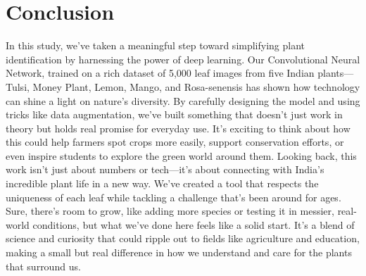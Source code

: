 \documentclass[twocolumn]{article}
\begin{document}
\section{Conclusion}
In this study, we've taken a meaningful step toward simplifying plant identification by harnessing the power of deep learning. Our Convolutional Neural Network, trained on a rich dataset of 5,000 leaf images from five Indian plants—Tulsi, Money Plant, Lemon, Mango, and Rosa-senensis has shown how technology can shine a light on nature's diversity. By carefully designing the model and using tricks like data augmentation, we've built something that doesn't just work in theory but holds real promise for everyday use. It's exciting to think about how this could help farmers spot crops more easily, support conservation efforts, or even inspire students to explore the green world around them.
Looking back, this work isn't just about numbers or tech—it's about connecting with India's incredible plant life in a new way. We've created a tool that respects the uniqueness of each leaf while tackling a challenge that's been around for ages. Sure, there's room to grow, like adding more species or testing it in messier, real-world conditions, but what we've done here feels like a solid start. It's a blend of science and curiosity that could ripple out to fields like agriculture and education, making a small but real difference in how we understand and care for the plants that surround us.



\end{document}
